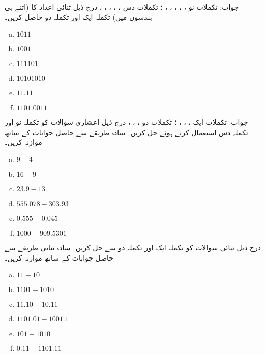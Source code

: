 جواب:  تکملات نو  ، ، ، ، ، ؛ تکملات دس  ، ، ، ، ، 
درج ذیل ثنائی اعداد کا (اتنے  ہی ہندسوں میں)  تکملہ ایک اور تکملہ دو حاصل کریں۔
\begin{multicols}{4}
\begin{enumerate}[a.]

\item  
 \(1011\)  
\item   
 \(1001\) 
\item  
 \(111101\) 
\item   
 \(10101010\) 
\item  
 \(11.11\)  
\item   
 \(1101.0011\) 
\end{enumerate}
\end{multicols}
جواب: تکملات ایک  ، ، ، ؛  تکملات دو  ، ، ، 
درج ذیل اعشاری سوالات کو تکملہ نو اور تکملہ دس استعمال کرتے ہوئے حل کریں۔ سادہ طریقے سے حاصل جوابات کے ساتھ موازنہ کریں۔
\begin{multicols}{3}
\begin{enumerate}[a.]

\item  
 \(9-4\)  
\item   
 \(16-9\) 
\item  
 \(23.9-13\) 
\item  
 \(555.078-303.93\) 
\item  
 \(0.555-0.045\) 
\item  
 \(1000-909.5301\) 
\end{enumerate}
\end{multicols}
درج ذیل ثنائی سوالات کو تکملہ ایک اور تکملہ دو سے حل کریں۔ سادہ ثنائی طریقے سے حاصل جوابات کے ساتھ موازنہ کریں۔
\begin{multicols}{3}
\begin{enumerate}[a.]
\item  
 \(11-10\)  
\item  
 \(1101-1010\) 
\item  
 \(11.10-10.11\) 
\item  
 \(1101.01-1001.1\) 
\item  
 \(101-1010\) 
\item  
 \(0.11-1101.11\) 
\end{enumerate}
\end{multicols}
